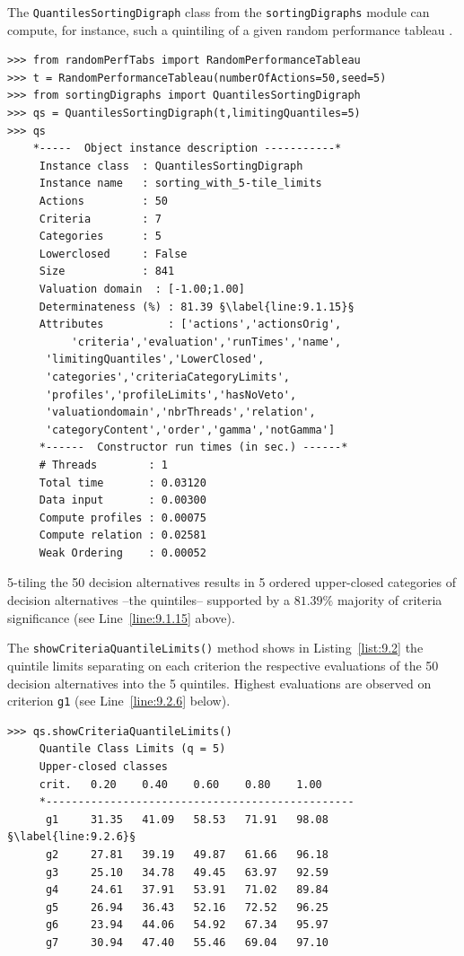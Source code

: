 The \texttt{QuantilesSortingDigraph} class  from the \texttt{sortingDigraphs} module can compute, for instance, such a quintiling of a given random performance tableau \citep{BIS-2021b}.
\begin{lstlisting}[caption={Computing a quintiles sorting result},label=list:9.1,basicstyle=\ttfamily\scriptsize]
>>> from randomPerfTabs import RandomPerformanceTableau
>>> t = RandomPerformanceTableau(numberOfActions=50,seed=5)
>>> from sortingDigraphs import QuantilesSortingDigraph
>>> qs = QuantilesSortingDigraph(t,limitingQuantiles=5)
>>> qs
    *-----  Object instance description -----------*
     Instance class  : QuantilesSortingDigraph
     Instance name   : sorting_with_5-tile_limits
     Actions         : 50
     Criteria        : 7
     Categories      : 5
     Lowerclosed     : False
     Size            : 841
     Valuation domain  : [-1.00;1.00]
     Determinateness (%) : 81.39 §\label{line:9.1.15}§
     Attributes          : ['actions','actionsOrig',
          'criteria','evaluation','runTimes','name',
	  'limitingQuantiles','LowerClosed',
	  'categories','criteriaCategoryLimits',
	  'profiles','profileLimits','hasNoVeto',
	  'valuationdomain','nbrThreads','relation',
	  'categoryContent','order','gamma','notGamma']
     *------  Constructor run times (in sec.) ------*
     # Threads        : 1
     Total time       : 0.03120
     Data input       : 0.00300
     Compute profiles : 0.00075
     Compute relation : 0.02581
     Weak Ordering    : 0.00052
\end{lstlisting}

5-tiling the 50 decision alternatives results in 5 ordered upper-closed categories of decision alternatives --the quintiles-- supported by a $81.39\%$ majority of criteria significance (see Line~\ref{line:9.1.15} above).

The \texttt{showCriteriaQuantileLimits()} method shows in Listing~\vref{list:9.2} the quintile limits separating on each criterion the respective evaluations of the 50 decision alternatives into the 5 quintiles. Highest evaluations are observed on criterion \texttt{g1} (see Line~\ref{line:9.2.6} below). 
\begin{lstlisting}[caption={Inspecting the quantile limits},label=list:9.2]
>>> qs.showCriteriaQuantileLimits()
     Quantile Class Limits (q = 5)
     Upper-closed classes
     crit.	 0.20	 0.40	 0.60	 0.80	 1.00	 
     *------------------------------------------------
      g1	 31.35	 41.09	 58.53	 71.91	 98.08	 §\label{line:9.2.6}§
      g2	 27.81	 39.19	 49.87	 61.66	 96.18	 
      g3	 25.10	 34.78	 49.45	 63.97	 92.59	 
      g4	 24.61	 37.91	 53.91	 71.02	 89.84	 
      g5	 26.94	 36.43	 52.16	 72.52	 96.25	 
      g6	 23.94	 44.06	 54.92	 67.34	 95.97	 
      g7	 30.94	 47.40	 55.46	 69.04	 97.10
\end{lstlisting}

